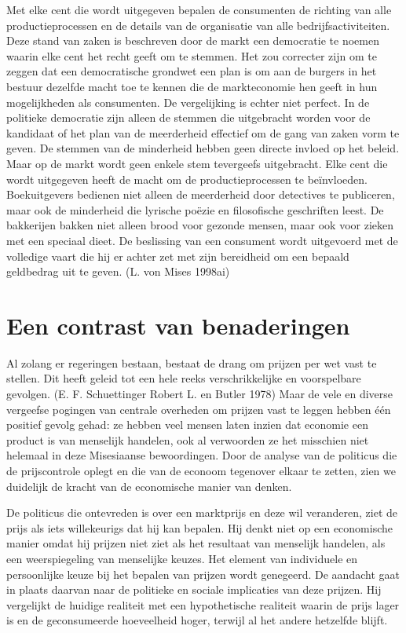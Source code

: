 \documentclass[
  a5paper,
  smalldemyvopaper,11pt,twoside,onecolumn,openright,extrafontsizes,
hidelinks]{memoir}
\begin{document}
Met elke cent die wordt uitgegeven bepalen de consumenten de richting
van alle productieprocessen en de details van de organisatie van alle
bedrijfsactiviteiten. Deze stand van zaken is beschreven door de markt
een democratie te noemen waarin elke cent het recht geeft om te stemmen.
Het zou correcter zijn om te zeggen dat een democratische grondwet een
plan is om aan de burgers in het bestuur dezelfde macht toe te kennen
die de markteconomie hen geeft in hun mogelijkheden als consumenten. De
vergelijking is echter niet perfect. In de politieke democratie zijn
alleen de stemmen die uitgebracht worden voor de kandidaat of het plan
van de meerderheid effectief om de gang van zaken vorm te geven. De
stemmen van de minderheid hebben geen directe invloed op het beleid.
Maar op de markt wordt geen enkele stem tevergeefs uitgebracht. Elke
cent die wordt uitgegeven heeft de macht om de productieprocessen te
beïnvloeden. Boekuitgevers bedienen niet alleen de meerderheid door
detectives te publiceren, maar ook de minderheid die lyrische poëzie en
filosofische geschriften leest. De bakkerijen bakken niet alleen brood
voor gezonde mensen, maar ook voor zieken met een speciaal dieet. De
beslissing van een consument wordt uitgevoerd met de volledige vaart die
hij er achter zet met zijn bereidheid om een bepaald geldbedrag uit te
geven. (L. von Mises 1998ai)

\section{Een contrast van
benaderingen}\label{een-contrast-van-benaderingen-1}

Al zolang er regeringen bestaan, bestaat de drang om prijzen per wet
vast te stellen. Dit heeft geleid tot een hele reeks verschrikkelijke en
voorspelbare gevolgen. (E. F. Schuettinger Robert L. en Butler 1978)
Maar de vele en diverse vergeefse pogingen van centrale overheden om
prijzen vast te leggen hebben één positief gevolg gehad: ze hebben veel
mensen laten inzien dat economie een product is van menselijk handelen,
ook al verwoorden ze het misschien niet helemaal in deze Misesiaanse
bewoordingen. Door de analyse van de politicus die de prijscontrole
oplegt en die van de econoom tegenover elkaar te zetten, zien we
duidelijk de kracht van de economische manier van denken.

De politicus die ontevreden is over een marktprijs en deze wil
veranderen, ziet de prijs als iets willekeurigs dat hij kan bepalen. Hij
denkt niet op een economische manier omdat hij prijzen niet ziet als het
resultaat van menselijk handelen, als een weerspiegeling van menselijke
keuzes. Het element van individuele en persoonlijke keuze bij het
bepalen van prijzen wordt genegeerd. De aandacht gaat in plaats daarvan
naar de politieke en sociale implicaties van deze prijzen. Hij
vergelijkt de huidige realiteit met een hypothetische realiteit waarin
de prijs lager is en de geconsumeerde hoeveelheid hoger, terwijl al het
andere hetzelfde blijft.
\end{document}
